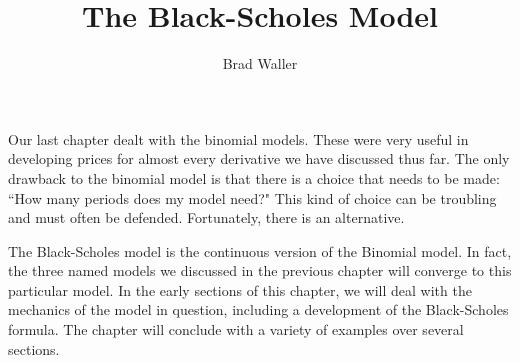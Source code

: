 \documentclass{ximera}
\title{The Black-Scholes Model}
\author{Brad Waller}
\begin{document}
\maketitle

Our last chapter dealt with the binomial models. These were very useful in developing prices for almost every derivative we have discussed thus far. The only drawback to the binomial model is that there is a choice that needs to be made: ``How many periods does my model need?" This kind of choice can be troubling and must often be defended. Fortunately, there is an alternative.

The Black-Scholes model is the continuous version of the Binomial model. In fact, the three named models we discussed in the previous chapter will converge to this particular model. In the early sections of this chapter, we will deal with the mechanics of the model in question, including a development of the Black-Scholes formula. The chapter will conclude with a variety of examples over several sections.
\end{document}
